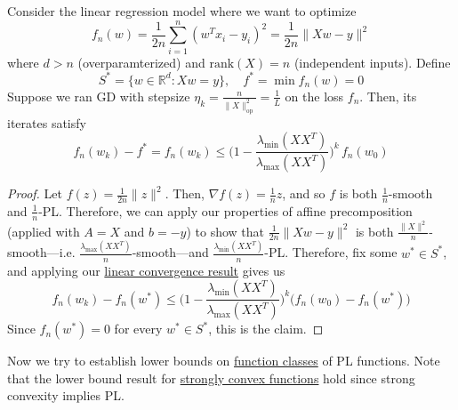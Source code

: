 	\begin{theorem}
	  \label{thm:linear-convergence-of-gd-in-overparameterized}
		Consider the linear regression model where we want to optimize
		\begin{equation}
			f_n (w) = \frac{1}{2n} \sum_{i=1}^n (w^T x_i - y_i)^2 = \frac{1}{2n} \|Xw - y\|^2
		\end{equation}
		where $d > n$ (overparamterized) and $\mathrm{rank}(X) = n$ (independent inputs). Define 
		\begin{equation}
			S^\ast = \{w \in \mathbb{R}^d \colon Xw = y\}, \quad f^\ast = \min{f_n (w)} = 0
		\end{equation}
		Suppose we ran GD with stepsize $\eta_k = \frac{n}{\|X\|_{\mathrm{op}}^2} = \frac{1}{L}$ on the loss $f_n$. Then, its iterates satisfy 
		\begin{equation}
			f_n(w_k) - f^\ast = f_n(w_k) \leq \bigg(1 - \frac{\lambda_{\min} (XX^T)}{\lambda_{\max} (XX^T)} \bigg)^k \, f_n(w_0)
		\end{equation}
	\end{theorem}
	\begin{proof}
		Let $f(z) = \frac{1}{2n} \|z\|^2$. Then, $\nabla f(z) = \frac{1}{n} z$, and so $f$ is both $\frac{1}{n}$-smooth and $\frac{1}{n}$-PL. Therefore, we can apply our properties of affine precomposition (applied with $A = X$ and $b = -y$) to show that $\frac{1}{2n} \|Xw - y\|^2$ is both $\frac{\|X\|^2}{n}$-smooth---i.e. $\frac{\lambda_{\max}(XX^T)}{n}$-smooth---and $\frac{\lambda_{\min} (XX^T)}{n}$-PL. Therefore, fix some $w^\ast \in S^\ast$, and applying our \hyperref[thm:linear_convergence_pl]{linear convergence result} gives us 
		\begin{equation}
			f_n(w_k) - f_n(w^\ast) \leq \bigg( 1 - \frac{\lambda_{\min} (XX^T)}{\lambda_{\max} (XX^T)} \bigg)^k \big(f_n(w_0) - f_n(w^\ast) \big) 
		\end{equation}
		Since $f_n(w^\ast) = 0$ for every $w^\ast \in S^\ast$, this is the claim. 
	\end{proof}
	
	Now we try to establish lower bounds on \hyperref[def:function-class]{function classes} of PL functions. Note that the lower bound result for \hyperref[mv-def:mu-strongly-convex]{strongly convex functions} hold since strong convexity implies PL. 

